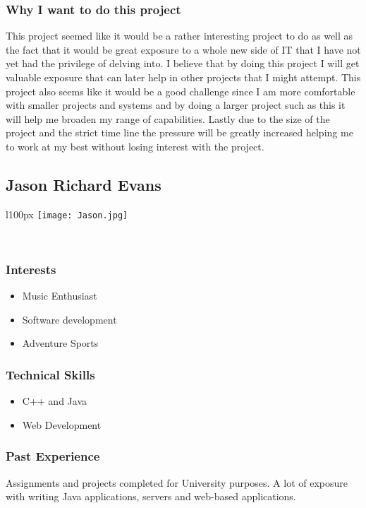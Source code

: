 \subsubsection{Why I want to do this project}
This project seemed like it would be a rather interesting project to do as well as the fact that it would be great exposure to a whole new side of IT that I have not yet had the privilege of delving into. I believe that by doing this project I will get valuable exposure that can later help in other projects that I might attempt. This project also seems like it would be a good challenge since I am more comfortable with smaller projects and systems and by doing a larger project such as this it will help me broaden my range of capabilities. Lastly due to the size of the project and the strict time line the pressure will be greatly increased helping me to work at my best without losing interest with the project. 

\pagebreak
\subsection{Jason Richard Evans}
\begin{wrapfigure}[5]{l}{100px}
\vspace{10pt}
\texttt{[image: Jason.jpg]}
\end{wrapfigure}

\textcolor{white}{.}
\subsubsection{Interests}
\begin{itemize}
	\item{Music Enthusiast}
	\item{Software development}
	\item{Adventure Sports}
\end{itemize}
\subsubsection{Technical Skills}
\begin{itemize}
	\item{C++ and Java}
	\item{Web Development}
\end{itemize}
\subsubsection{Past Experience}
Assignments and projects completed for University purposes. A lot of exposure with writing Java applications, servers and web-based applications.
